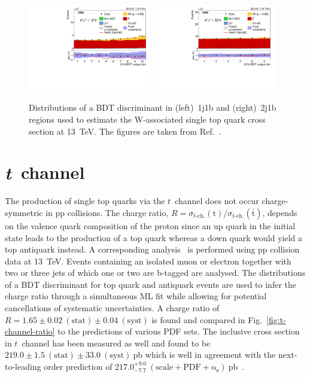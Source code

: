 \documentclass{PoS}
\begin{document}
\begin{figure}[!htb]
\begin{center}
\includegraphics[width=0.48\textwidth]{tw2.pdf}\hspace{0.02\textwidth}
\includegraphics[width=0.48\textwidth]{tw3.pdf}
\caption{\label{fig:tw-channel-bdt}Distributions of a BDT discriminant in (left)~1j1b and (right)~2j1b regions used to estimate the W-associated single top quark cross section at 13~TeV. The figures are taken from Ref.~\cite{tWch}.}
\end{center}
\end{figure}

\section{\textit{t}~channel}

The production of single top quarks via the $t$~channel does not occur charge-symmetric in pp collisions. The charge ratio, $R=\sigma_{t\mbox{-}\mathrm{ch.}}({\mathrm{t}})/\sigma_{t\mbox{-}\mathrm{ch.}}({\bar{\mathrm{t}}})$, depends on the valence quark composition of the proton since an up quark in the initial state leads to the production of a top quark whereas a down quark would yield a top antiquark instead. A corresponding analysis~\cite{tch} is performed using pp collision data at 13~TeV. Events containing an isolated muon or electron together with two or three jets of which one or two are b-tagged are analysed. The distributions of a BDT discriminant for top quark and antiquark events are used to infer the charge ratio through a simultaneous ML fit while allowing for potential cancellations of systematic uncertainties. A charge ratio of $R=1.65\pm0.02~\mathrm{(stat)}\pm0.04~\mathrm{(syst)}$ is found and compared in Fig.~\ref{fig:t-channel-ratio} to the predictions of various PDF sets. The inclusive cross section in $t$~channel has been measured as well and found to be $219.0\pm1.5~\mathrm{(stat)}\pm33.0~\mathrm{(syst)}~\mathrm{pb}$ which is well in agreement with the next-to-leading order prediction of $217.0^{+9.0}_{-7.7}~\mathrm{(scale+PDF+\alpha_s)}~\mathrm{pb}$~\cite{hathor}.
 
\end{document}
